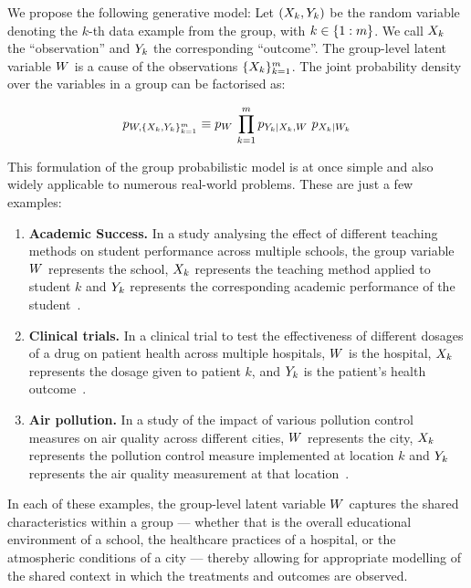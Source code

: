 \documentclass[../thesis.tex]{subfiles}
\begin{document}
We propose the following generative model: Let $(\myrv{x}_{k}, \myrv{y}_{k})$ be the random variable denoting the $k$-th data example from the group, with $k \in \{1:m\}$. We call $\myrv{x}_{k}$ the ``observation'' and $\myrv{y}_{k}$ the corresponding ``outcome''. The group-level latent variable $\myrv{w}$ is a cause of the observations $\{\myrv{x}_{k}\}_{k=1}^{\mycnt{m}}$. The joint probability density over the variables in a group can be factorised as: 

\[
    \myfunc{p}_{\myrv{w}, \{\myrv{x}_{k}, \myrv{y}_{k}\}_{k=1}^{\mycnt{m}}} \equiv \myfunc{p}_{\myrv{w}} \, \prod_{k=1}^{\mycnt{m}} \myfunc{p}_{\myrv{y}_k | \myrv{x}_{k}, \myrv{w}} ~ \myfunc{p}_{\myrv{x}_{k} | \myrv{w}_k}
\]

This formulation of the group probabilistic model is at once simple and also widely applicable to numerous real-world problems. These are just a few examples:

\begin{enumerate}
    \item \textbf{Academic Success.} In a study analysing the effect of different teaching methods on student performance across multiple schools, the group variable $\myrv{w}$ represents the school, $\myrv{x}_{k}$ represents the teaching method applied to student $k$ and $\myrv{y}_{k}$ represents the corresponding academic performance of the student~\citep{brykHierarchicalLinearModels1992}.
    \item \textbf{Clinical trials.} In a clinical trial to test the effectiveness of different dosages of a drug on patient health across multiple hospitals, $\myrv{w}$ is the hospital, $\myrv{x}_{k}$ represents the dosage given to patient $k$, and $\myrv{y}_{k}$ is the patient's health outcome~\citep{pinheiroMixedEffectsModelsSPLUS2001}.
    \item \textbf{Air pollution.} In a study of the impact of various pollution control measures on air quality across different cities, $\myrv{w}$ represents the city, $\myrv{x}_{k}$ represents the pollution control measure implemented at location $k$ and $\myrv{y}_{k}$ represents the air quality measurement at that location~\citep{cressieStatisticsSpatioTemporalData2011}.
\end{enumerate}

In each of these examples, the group-level latent variable $\myrv{w}$ captures the shared characteristics within a group --- whether that is the overall educational environment of a school, the healthcare practices of a hospital, or the atmospheric conditions of a city --- thereby allowing for appropriate modelling of the shared context in which the treatments and outcomes are observed.
\end{document}
